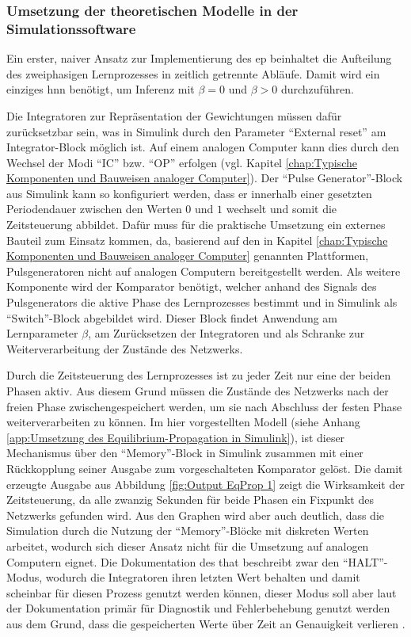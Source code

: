 \subsubsection{Umsetzung der theoretischen Modelle in der Simulationssoftware}
\label{chap:Umsetzung der theoretischen Modelle in der Simulationssoftware}

Ein erster, naiver Ansatz zur Implementierung des \ac{ep} beinhaltet die Aufteilung des zweiphasigen Lernprozesses in zeitlich getrennte Abläufe. Damit wird ein einziges \ac{hnn} benötigt, um Inferenz mit \(\beta=0\) und \(\beta>0\) durchzuführen.

Die Integratoren zur Repräsentation der Gewichtungen müssen dafür zurücksetzbar sein, was in Simulink durch den Parameter "`External reset"' am Integrator-Block möglich ist. Auf einem analogen Computer kann dies durch den Wechsel der Modi "`IC"' bzw. "`OP"' erfolgen (vgl. Kapitel \ref{chap:Typische Komponenten und Bauweisen analoger Computer}). Der "`Pulse Generator"'-Block aus Simulink kann so konfiguriert werden, dass er innerhalb einer gesetzten Periodendauer zwischen den Werten \(0\) und \(1\) wechselt und somit die Zeitsteuerung abbildet. Dafür muss für die praktische Umsetzung ein externes Bauteil zum Einsatz kommen, da, basierend auf den in Kapitel \ref{chap:Typische Komponenten und Bauweisen analoger Computer} genannten Plattformen, Pulsgeneratoren nicht auf analogen Computern bereitgestellt werden. Als weitere Komponente wird der Komparator benötigt, welcher anhand des Signals des Pulsgenerators die aktive Phase des Lernprozesses bestimmt und in Simulink als "`Switch"'-Block abgebildet wird. Dieser Block findet Anwendung am Lernparameter \(\beta\), am Zurücksetzen der Integratoren und als Schranke zur Weiterverarbeitung der Zustände des Netzwerks.

Durch die Zeitsteuerung des Lernprozesses ist zu jeder Zeit nur eine der beiden Phasen aktiv. Aus diesem Grund müssen die Zustände des Netzwerks nach der freien Phase zwischengespeichert werden, um sie nach Abschluss der festen Phase weiterverarbeiten zu können. Im hier vorgestellten Modell (siehe Anhang \ref{app:Umsetzung des Equilibrium-Propagation in Simulink}), ist dieser Mechanismus über den "`Memory"'-Block in Simulink zusammen mit einer Rückkopplung seiner Ausgabe zum vorgeschalteten Komparator gelöst. Die damit erzeugte Ausgabe aus Abbildung \ref{fig:Output EqProp 1} zeigt die Wirksamkeit der Zeitsteuerung, da alle zwanzig Sekunden für beide Phasen ein Fixpunkt des Netzwerks gefunden wird. Aus den Graphen wird aber auch deutlich, dass die Simulation durch die Nutzung der "`Memory"'-Blöcke mit diskreten Werten arbeitet, wodurch sich dieser Ansatz nicht für die Umsetzung auf analogen Computern eignet. Die Dokumentation des \ac{that} beschreibt zwar den "`HALT"'-Modus, wodurch die Integratoren ihren letzten Wert behalten und damit scheinbar für diesen Prozess genutzt werden können, dieser Modus soll aber laut der Dokumentation primär für Diagnostik und Fehlerbehebung genutzt werden \ua aus dem Grund, dass die gespeicherten Werte über Zeit an Genauigkeit verlieren \cite[vgl.]{TheAnalogThingDocs}.

